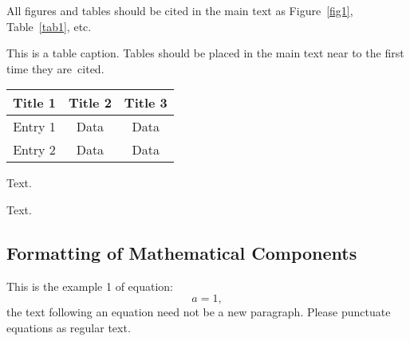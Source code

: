 \documentclass[entropy,article,submit,moreauthors,pdftex]{Definitions/mdpi}
\begin{document}
All figures and tables should be cited in the main text as Figure~\ref{fig1}, Table~\ref{tab1}, etc.


\begin{specialtable}[H] 
\caption{This is a table caption. Tables should be placed in the main text near to the first time they are~cited.\label{tab1}}
\begin{tabular}{ccc}
\toprule
\textbf{Title 1}	& \textbf{Title 2}	& \textbf{Title 3}\\
\midrule
Entry 1		& Data			& Data\\
Entry 2		& Data			& Data\\
\bottomrule
\end{tabular}
\end{specialtable}


Text.

Text.

\subsection{Formatting of Mathematical Components}

This is the example 1 of equation:
\begin{equation}
a = 1,
\end{equation}
the text following an equation need not be a new paragraph. Please punctuate equations as regular text.
\end{document}
